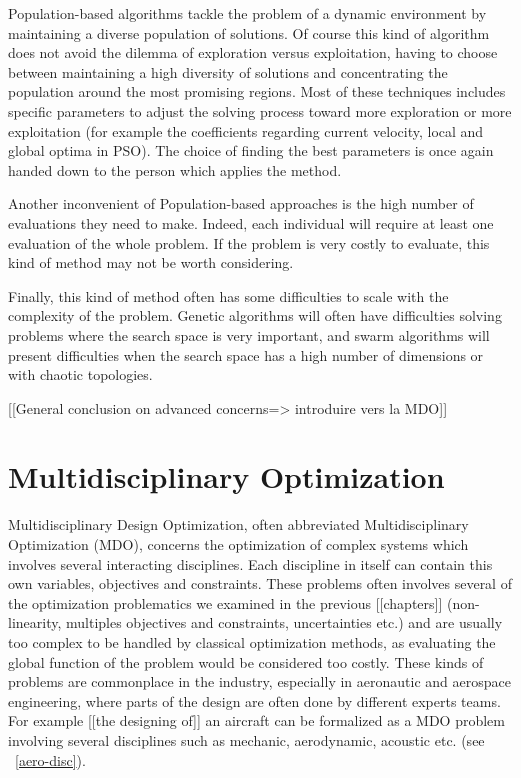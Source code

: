 Population-based algorithms tackle the problem of a dynamic environment by maintaining a diverse population of solutions. Of course this kind of algorithm does not avoid the dilemma of exploration versus exploitation, having to choose between maintaining a high diversity of solutions and concentrating the population around the most promising regions. Most of these techniques includes specific parameters to adjust the solving process toward more exploration or more exploitation (for example the coefficients regarding current velocity, local and global optima in PSO). The choice of finding the best parameters is once again handed down to the person which applies the method.

Another inconvenient of Population-based approaches is the high number of evaluations they need to make. Indeed, each individual will require at least one evaluation of the whole problem. If the problem is very costly to evaluate, this kind of method may not be worth considering.

Finally, this kind of method often has some difficulties to scale with the complexity of the problem. Genetic algorithms will often have difficulties solving problems where the search space is very important, and swarm algorithms will present difficulties when the search space has a high number of dimensions or with chaotic topologies.

[[General conclusion on advanced concerns=> introduire vers la MDO]]

\chapter{Multidisciplinary Optimization}

Multidisciplinary Design Optimization, often abbreviated Multidisciplinary Optimization (MDO), concerns the optimization of complex systems which involves several interacting disciplines. Each discipline in itself can contain this own variables, objectives and constraints. These problems often involves several of the optimization problematics we examined in the previous [[chapters]] (non-linearity, multiples objectives and constraints, uncertainties etc.) and are usually too complex to be handled by classical optimization methods, as evaluating the global function of the problem would be considered too costly.
These kinds of problems are commonplace in the industry, especially in aeronautic and aerospace engineering, where parts of the design are often done by different experts teams. For example [[the designing of]] an aircraft can be formalized as a MDO problem involving several disciplines such as mechanic, aerodynamic, acoustic etc. (see \figurename\ \ref{aero-disc}).

